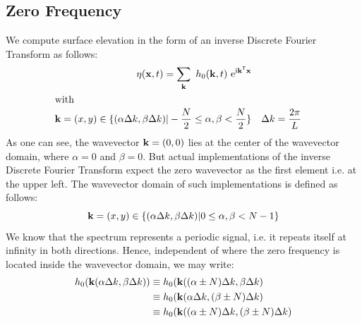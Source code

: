 \subsection{Zero Frequency}
%
\newcommand{\ccellnum}[2]{\cellcolor{#1}\num{#2}}
\newcommand{\mcleft}[2]{\multicolumn{1}{!{\color{#1}\vline}S}{#2}}
\newcommand{\mcright}[2]{\multicolumn{1}{S !{\color{#1}\vline}}{#2}}
\newcommand{\mcleftright}[2]{\multicolumn{1}{!{\color{#1}\vline} S !{\color{#1}\vline}}{#2}}
%
We compute surface elevation in the form of an inverse Discrete Fourier Transform as follows:
\begin{align}
\label{eq:surface_elevation_h0_k_t}
\eta(\mathbf{x}, t) = \sum_{\mathbf{k}}~h_0(\mathbf{k},t)~\mathrm{e}^{\mathrm{i}\mathbf{k}^{\mathsf{T}}\mathbf{x}} \\
\intertext{with}
\notag \mathbf{k} = (x,y)\in\{(\alpha\Delta k,\beta\Delta k)|
-\frac{N}{2}\leq\alpha,\beta<\frac{N}{2}\} &&
\Delta k = \frac{2\pi}{L}&
\end{align}
As one can see, the wavevector $\mathbf{k} = (0,0)$ lies at the center of the wavevector domain,
where $\alpha=0$ and $\beta=0$. But actual implementations of the inverse Discrete Fourier Transform
expect the zero wavevector as the first element i.e. at the upper left. The wavevector domain
of such implementations is defined as follows:
\begin{equation*}
\mathbf{k} = (x,y)\in\{(\alpha\Delta k,\beta\Delta k)|
0\leq\alpha,\beta<N-1\}
\end{equation*}
We know that the spectrum represents a periodic signal, i.e. it repeats itself at infinity in both directions.
Hence, independent of where the zero frequency is located inside the wavevector domain, we may write:
\begin{align*}
 h_0(\mathbf{k}(\alpha\Delta k,\beta\Delta k)) &\equiv h_0(\mathbf{k}((\alpha\pm N)\Delta k, \beta\Delta k) \\
					     &\equiv h_0(\mathbf{k}(\alpha\Delta k, (\beta\pm N)\Delta k) \\
					     &\equiv h_0(\mathbf{k}((\alpha\pm N)\Delta k, (\beta\pm N)\Delta k)
\end{align*}
%
